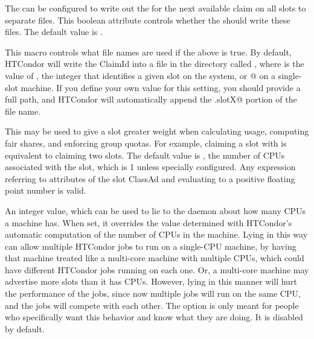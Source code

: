 \begin{description}
\label{param:StartdShouldWriteClaimIdFile}
\item[\Macro{STARTD\_SHOULD\_WRITE\_CLAIM\_ID\_FILE}]
  The  can be configured
  to write out the  for the next available claim on all
  slots to separate files.
  This boolean attribute controls whether the  should
  write these files.
  The default value is .
  
\label{param:StartdClaimIdFile}
\item[\Macro{STARTD\_CLAIM\_ID\_FILE}]
  This macro controls what file names are used if the above
   is true.  By
  default, HTCondor will write the ClaimId into a file in the
   directory called , where
  \verb@X@ is the value of , the integer that
  identifies a given slot on the system, or @ on a
  single-slot machine.
  If you define your own value for this setting, you should provide a
  full path, and HTCondor will automatically append the \verb@.slotX@
  portion of the file name.

\label{param:SlotWeight}
\item[\Macro{SlotWeight}]
  This may be used to give a slot greater weight when
  calculating usage, computing fair shares, and enforcing group
  quotas.  For example, claiming a slot with  is
  equivalent to claiming two  slots.  The default
  value is , the number of CPUs associated with the slot,
  which is 1 unless specially configured.  Any expression referring to
  attributes of the slot ClassAd and evaluating to a positive floating
  point number is valid.

\label{param:NumCpus}
\item[\Macro{NUM\_CPUS}]
  An integer value, which can be used to lie to the  daemon
  about how many CPUs a machine has.
  When set, it overrides the value determined with HTCondor's 
  automatic computation of the number of CPUs in the machine.
  Lying in this way can allow multiple HTCondor jobs to run on a
  single-CPU machine, by having that machine treated like a multi-core 
  machine with multiple CPUs, which could have different HTCondor jobs
  running on each one.
  Or, a multi-core machine may advertise more slots than it has CPUs.
  However, lying in this manner will hurt the performance of the jobs,
  since now multiple jobs will run on the same CPU,
  and the jobs will compete with each other.
  The option is only meant for people who specifically want this
  behavior and know what they are doing.  
  It is disabled by default.


\end{description}

